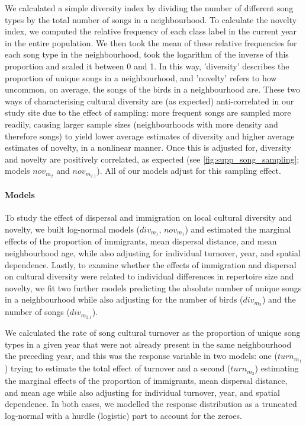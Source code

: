 \documentclass[9pt, twocolumn, twoside]{gsajnl}
\begin{document}
We calculated a simple diversity index by dividing the number of different song types by the total number of songs in a neighbourhood. To calculate the novelty index, we computed the relative frequency of each class label in the current year in the entire population. We then took the mean of these relative frequencies for each song type in the neighbourhood, took the logarithm of the inverse of this proportion and scaled it between 0 and 1. In this way, 'diversity' describes the proportion of unique songs in a neighbourhood, and 'novelty' refers to how uncommon, on average, the songs of the birds in a neighbourhood are. These two ways of characterising cultural diversity are (as expected) anti-correlated in our study site due to the effect of sampling: more frequent songs are sampled more readily, causing larger sample sizes (neighbourhoods with more density and therefore songs) to yield lower average estimates of diversity and higher average estimates of novelty, in a nonlinear manner. Once this is adjusted for, diversity and novelty are positively correlated, as expected (see \autoref{fig:supp_song_sampling}; models $nov_{m_2}$ and $nov_{m_{2.1}}$). All of our models adjust for this sampling effect.

\paragraph{Models}

To study the effect of dispersal and immigration on local cultural diversity and novelty, we built log-normal models ($div_{m_1}$, $nov_{m_1}$) and estimated the marginal effects of the proportion of immigrants, mean dispersal distance, and mean neighbourhood age, while also adjusting for individual turnover, year, and spatial dependence. Lastly, to examine whether the effects of immigration and dispersal on cultural diversity were related to individual differences in repertoire size and novelty, we fit two further models predicting the absolute number of unique songs in a neighbourhood while also adjusting for the number of birds ($div_{m_2}$) and the number of songs ($div_{m_{2.1}}$).

We calculated the rate of song cultural turnover as the proportion of unique song types in a given year that were not already present in the same neighbourhood the preceding year, and this was the response variable in two models: one ($turn_{m_1}$) trying to estimate the total effect of turnover and a second ($turn_{m_2}$) estimating the marginal effects of the proportion of immigrants, mean dispersal distance, and mean age while also adjusting for individual turnover, year, and spatial dependence. In both cases, we modelled the response distribution as a truncated log-normal with a hurdle (logistic) part to account for the zeroes. 
\end{document}

